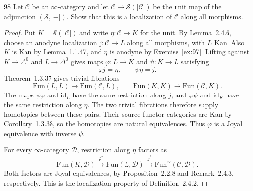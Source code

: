 \begin{exercise}{98}
Let $\mathcal C$ be an $\infty$-category and let
$\mathcal C\to\mathcal S(|\mathcal C|)$ be the unit map of the adjunction
$(\mathcal S,|{-}|)$. Show that this is a localization of $\mathcal C$ along
all morphisms.

\begin{proof}
Put $K=\mathcal S(|\mathcal C|)$ and write $\eta\colon\mathcal C\to K$
for the unit. By Lemma~2.4.6, choose an anodyne localization
$j\colon\mathcal C\to L$ along all morphisms, with $L$ Kan.
Also $K$ is Kan by Lemma~1.1.47, and $\eta$ is anodyne by
Exercise~\ref{ex:97}.
Lifting against $K\to\Delta^0$ and $L\to\Delta^0$ gives maps
$\varphi\colon L\to K$ and $\psi\colon K\to L$ satisfying
\[
 \varphi j=\eta,\qquad \psi\eta=j.
\]
Theorem~1.3.37 gives trivial fibrations
\[
 \mathrm{Fun}(L,L)\longrightarrow\mathrm{Fun}(\mathcal C,L),
 \qquad
 \mathrm{Fun}(K,K)\longrightarrow\mathrm{Fun}(\mathcal C,K).
\]
The maps $\psi\varphi$ and $\mathrm{id}_L$ have the same restriction
along $j$, and $\varphi\psi$ and $\mathrm{id}_K$ have the same restriction
along $\eta$.
The two trivial fibrations therefore supply homotopies between these pairs.
Their source functor categories are Kan by Corollary~1.3.38,
so the homotopies are natural equivalences.
Thus $\varphi$ is a Joyal equivalence with inverse $\psi$.

For every $\infty$-category $\mathcal D$, restriction along $\eta$ factors as
\[
 \mathrm{Fun}(K,\mathcal D)\xrightarrow{\varphi^*}
 \mathrm{Fun}(L,\mathcal D)\xrightarrow{j^*}
 \mathrm{Fun}^{\simeq}(\mathcal C,\mathcal D).
\]
Both factors are Joyal equivalences, by Proposition~2.2.8 and
Remark~2.4.3, respectively.
This is the localization property of Definition~2.4.2.
\end{proof}
\end{exercise}
